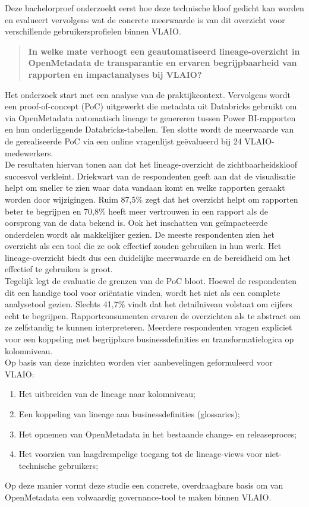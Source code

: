 Deze bachelorproef onderzoekt eerst hoe deze technische kloof gedicht kan worden en evalueert vervolgens wat de concrete meerwaarde is van dit overzicht voor verschillende gebruikersprofielen binnen VLAIO. 
\begin{quote}
	\textbf{In welke mate verhoogt een geautomatiseerd li\-ne\-age-over\-zicht in OpenMetadata de transparantie en ervaren begrijpbaarheid van rapporten en impactanalyses bij VLAIO?}
\end{quote}

Het onderzoek start met een analyse van de praktijkcontext. Vervolgens wordt een proof-of-concept (PoC) uitgewerkt die metadata uit Databricks gebruikt om via OpenMetadata automatisch lineage te genereren tussen Power BI-rap\-por\-ten en hun onderliggende Data\-bricks-ta\-bel\-len. Ten slotte wordt de meerwaarde van de gerealiseerde PoC via een online vragenlijst geëvalueerd bij 24 VLAIO-medewerkers.\\

De resultaten hiervan tonen aan dat het li\-ne\-age-over\-zicht de zichtbaarheidskloof succesvol verkleint. Driekwart van de respondenten geeft aan dat de visualisatie helpt om sneller te zien waar data vandaan komt en welke rapporten geraakt worden door wijzigingen. Ruim 87,5\% zegt dat het overzicht helpt om rapporten beter te begrijpen en 70,8\% heeft meer vertrouwen in een rapport als de oorsprong van de data bekend is. Ook het inschatten van geïmpacteerde onderdelen wordt als makkelijker gezien. De meeste respondenten zien het overzicht als een tool die ze ook effectief zouden gebruiken in hun werk. Het lineage-overzicht biedt dus een duidelijke meerwaarde en de bereidheid om het effectief te gebruiken is groot.\\

Tegelijk legt de evaluatie de grenzen van de PoC bloot. Hoewel de respondenten dit een handige tool voor oriëntatie vinden, wordt het niet als een complete analysetool gezien. Slechts 41,7\% vindt dat het detailniveau volstaat om cijfers echt te begrijpen. Rapportconsumenten ervaren de overzichten als te abstract om ze zelfstandig te kunnen interpreteren. Meerdere respondenten vragen expliciet voor een koppeling met begrijpbare businessdefinities en transformatielogica op kolomniveau.\\

Op basis van deze inzichten worden vier aanbevelingen geformuleerd voor VLAIO: 
\begin{enumerate}
	\item Het uitbreiden van de lineage naar kolomniveau;
	\item Een koppeling van lineage aan businessdefinities (glossaries);
	\item Het opnemen van OpenMetadata in het bestaande change- en releaseproces;
	\item Het voorzien van laagdrempelige toegang tot de lineage-views voor niet-tech\-nische gebruikers;
\end{enumerate} 
Op deze manier vormt deze studie een concrete, overdraagbare basis om van OpenMetadata een volwaardig go\-ver\-nance-tool te maken binnen VLAIO.

